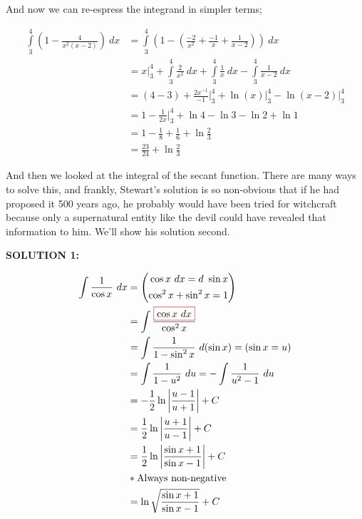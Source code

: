 \documentclass{article}
\begin{document}
\vspace{10pt}

And now we can re-espress the integrand in simpler terms;

\begin{align*}
\int\limits_3^4\left(1-\frac{4}{x^2(x-2)}\right)\ dx&=\int\limits_3^4\left(1-\left(\frac{-2}{x^2}+\frac{-1}{x}+\frac{1}{x-2}\right)\right)\ dx\\
&=x\Big|_3^4+\int\limits_3^4\frac{2}{x^2}\ dx+\int\limits_3^4\frac{1}{x}\ dx-\int\limits_3^4\frac{1}{x-2}\ dx\\
&=(4-3)+\frac{2x^{-1}}{-1}\Bigg|_3^4+\ln(x)\Big|_3^4-\ln(x-2)\Big|_3^4\\
&=1-\frac{1}{2x}\Bigg|_3^4+\ln4-\ln3-\ln2+\ln1\\
&=1-\frac{1}{8}+\frac{1}{6}+\ln\frac{2}{3}\\
&=\frac{23}{24}+\ln\frac{2}{3}
\end{align*}

\vspace{10pt}

And then we looked at the integral of the secant function. There are many ways to solve this, and frankly, Stewart's solution is so non-obvious that if he had proposed it 500 years ago, he probably would have been tried for witchcraft because only a supernatural entity like the devil could have revealed that information to him. We'll show his solution second.

\vspace{10pt}

{\bf{}SOLUTION 1:}

\begin{align*}
\int\frac{1}{\cos x}\ dx&=\left(\begin{aligned}\cos x\ dx=d\ \sin x\\\cos^2x+\sin^2x=1\end{aligned}\right)\\
&=\int\frac{\color{red}\boxed{\color{black}\cos x\ dx}}{\cos^2x}\\
&=\int\frac{1}{1-\sin^2x}\ d(\sin x)=(\sin x=u)\\
&=\int\frac{1}{1-u^2}\ du=-\int\frac{1}{u^2-1}\ du\\
&=-\frac{1}{2}\ln\left|\frac{u-1}{u+1}\right|+C\\
&=\frac{1}{2}\ln\left|\frac{u+1}{u-1}\right|+C\\
&=\frac{1}{2}\ln\left|\frac{\sin x+1}{\sin x-1}\right|+C\\
&*\mbox{Always non-negative}\\
&=\ln\sqrt{\frac{\sin x+1}{\sin x-1}}+C
\end{align*}
\end{document}
